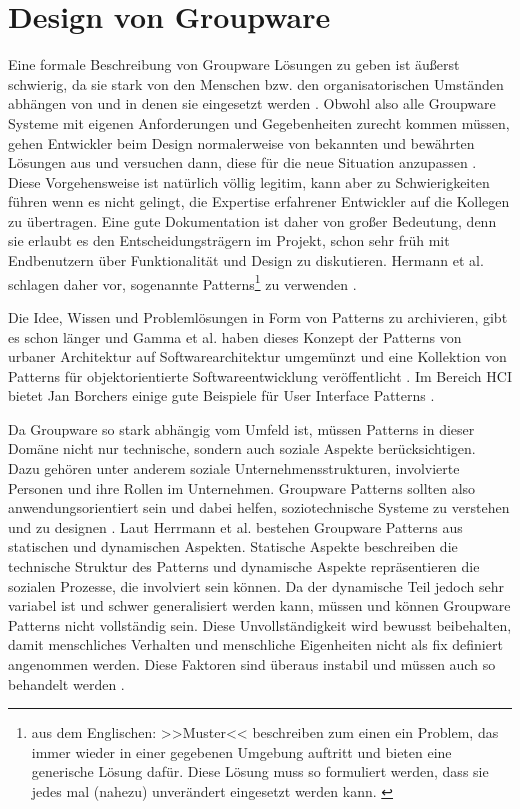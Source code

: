 \section{Design von Groupware}

Eine formale Beschreibung von Groupware Lösungen zu geben ist äußerst schwierig, da sie stark von den Menschen bzw. den organisatorischen Umständen abhängen von und in denen sie eingesetzt werden \citep{Suchman:1995}. Obwohl also alle Groupware Systeme mit eigenen Anforderungen und Gegebenheiten zurecht kommen müssen, gehen Entwickler beim Design normalerweise von bekannten und bewährten Lösungen aus und versuchen dann, diese für die neue Situation anzupassen \citep{Herrmann:2003}. Diese Vorgehensweise ist natürlich völlig legitim, kann aber zu Schwierigkeiten führen wenn es nicht gelingt, die Expertise erfahrener Entwickler auf die Kollegen zu übertragen. Eine gute Dokumentation ist daher von großer Bedeutung, denn sie erlaubt es den Entscheidungsträgern im Projekt, schon sehr früh mit Endbenutzern über Funktionalität und Design zu diskutieren. Hermann et al. schlagen daher vor, sogenannte Patterns\footnote{aus dem Englischen: >>Muster<< beschreiben zum einen ein Problem, das immer wieder in einer gegebenen Umgebung auftritt und bieten eine generische Lösung dafür. Diese Lösung muss so formuliert werden, dass sie jedes mal (nahezu) unverändert eingesetzt werden kann. \citep{Herrmann:2003}} zu verwenden \citep{Herrmann:2003}. 

\medskip Die Idee, Wissen und Problemlösungen in Form von Patterns zu archivieren, gibt es schon länger und Gamma et al. haben dieses Konzept der Patterns von urbaner Architektur auf Softwarearchitektur umgemünzt und eine Kollektion von Patterns für objektorientierte Softwareentwicklung veröffentlicht \citep{Gamma:1995}. Im Bereich \ac{HCI} bietet Jan Borchers einige gute Beispiele für User Interface Patterns \citep{Borchers:2000}.

\medskip Da Groupware so stark abhängig vom Umfeld ist, müssen Patterns in dieser Domäne nicht nur technische, sondern auch soziale Aspekte berücksichtigen. Dazu gehören unter anderem soziale Unternehmensstrukturen, involvierte Personen und ihre Rollen im Unternehmen. Groupware Patterns sollten also anwendungsorientiert sein und dabei helfen, soziotechnische Systeme zu verstehen und zu designen \citep{Herrmann:2003, Eason:1988}. Laut Herrmann et al. bestehen Groupware Patterns aus statischen und dynamischen Aspekten. Statische Aspekte beschreiben die technische Struktur des Patterns und dynamische Aspekte repräsentieren die sozialen Prozesse, die involviert sein können. Da der dynamische Teil jedoch sehr variabel ist und schwer generalisiert werden kann, müssen und können Groupware Patterns nicht vollständig sein. Diese Unvollständigkeit wird bewusst beibehalten, damit menschliches Verhalten und menschliche Eigenheiten nicht als fix definiert angenommen werden. Diese Faktoren sind überaus instabil und müssen auch so behandelt werden \citep{Herrmann:2003}.

